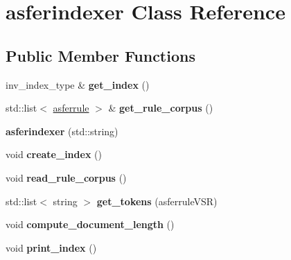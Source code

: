 \hypertarget{classasferindexer}{\section{asferindexer Class Reference}
\label{classasferindexer}
}
\subsection*{Public Member Functions}
\begin{DoxyCompactItemize}
\item 
\hypertarget{classasferindexer_a1c2c4689d681b2e06599a7f60f474f53}{inv\-\_\-index\-\_\-type \& {\bfseries get\-\_\-index} ()}\label{classasferindexer_a1c2c4689d681b2e06599a7f60f474f53}

\item 
\hypertarget{classasferindexer_a2ea96f6ab9ef64d85c750a9c2321b7fb}{std\-::list$<$ \hyperlink{classasferrule}{asferrule} $>$ \& {\bfseries get\-\_\-rule\-\_\-corpus} ()}\label{classasferindexer_a2ea96f6ab9ef64d85c750a9c2321b7fb}

\item 
\hypertarget{classasferindexer_a68446251c8761d6cdc6b846bfb858631}{{\bfseries asferindexer} (std\-::string)}\label{classasferindexer_a68446251c8761d6cdc6b846bfb858631}

\item 
\hypertarget{classasferindexer_aeb859a81a633c9d6be33074e4239bff4}{void {\bfseries create\-\_\-index} ()}\label{classasferindexer_aeb859a81a633c9d6be33074e4239bff4}

\item 
\hypertarget{classasferindexer_a1e5a9c9bf98e556bc6421bd705edb97e}{void {\bfseries read\-\_\-rule\-\_\-corpus} ()}\label{classasferindexer_a1e5a9c9bf98e556bc6421bd705edb97e}

\item 
\hypertarget{classasferindexer_a6b6a1f9b0171e66afe074605c404675d}{std\-::list$<$ string $>$ {\bfseries get\-\_\-tokens} (asferrule\-V\-S\-R)}\label{classasferindexer_a6b6a1f9b0171e66afe074605c404675d}

\item 
\hypertarget{classasferindexer_a55e216cc50fd1d9044612bafa033ae8c}{void {\bfseries compute\-\_\-document\-\_\-length} ()}\label{classasferindexer_a55e216cc50fd1d9044612bafa033ae8c}

\item 
\hypertarget{classasferindexer_a8ec069871b311eeefc2707677de1b544}{void {\bfseries print\-\_\-index} ()}\label{classasferindexer_a8ec069871b311eeefc2707677de1b544}

\end{DoxyCompactItemize}
